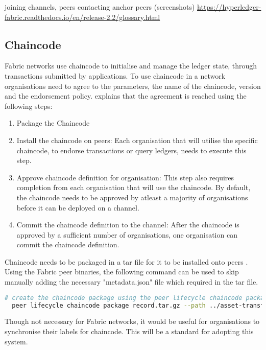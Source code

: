 joining channels, peers contacting anchor peers (screenshots) \url{https://hyperledger-fabric.readthedocs.io/en/release-2.2/glossary.html}

\subsection{Chaincode}
Fabric networks use chaincode to initialise and manage the ledger state, through transactions submitted by applications. \cite{noauthor_writing_nodate}
To use chaincode in a network organisations need to agree to the parameters, the name of the chaincode, version and the endorsement policy. 
\cite{noauthor_writing_nodate} explains that the agreement is reached using the following steps:
\begin{enumerate}
  \item Package the Chaincode
  \item Install the chaincode on peers: Each organisation that will utilise the specific chaincode, to endorse transactions or query ledgers, needs to execute this step.
  \item Approve chaincode definition for organisation: This step also requires completion from each organisation that will use the chaincode. By default, the chaincode needs to be approved by atleast a majority of organisations before it can be deployed on a channel.
  \item Commit the chaincode definition to the channel: After the chaincode is approved by a sufficient number of organisations, one organisation can commit the chaincode definition.
\end{enumerate}

Chaincode needs to be packaged in a tar file for it to be installed onto peers \cite{noauthor_fabric_nodate}. Using the Fabric peer binaries, the following command can be used to skip manually adding the necessary "metadata.json" file which required in the tar file.
\begin{lstlisting}[language=bash, caption={peer lifecycle chaincode package command}]
  # create the chaincode package using the peer lifecycle chaincode package command
  peer lifecycle chaincode package record.tar.gz --path ../asset-transfer-basic/chaincode-go/ --lang golang --label record_1.0
\end{lstlisting}

Though not necessary for Fabric networks, it would be useful for organisations to synchronise their labels for chaincode. 
This will be a standard for adopting this system.

